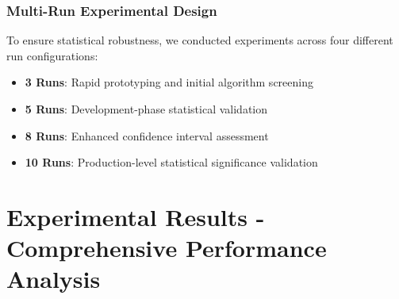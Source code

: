 \documentclass[12pt,a4paper]{article}
\begin{document}
\subsubsection{Multi-Run Experimental Design}

To ensure statistical robustness, we conducted experiments across four different run configurations:

\begin{itemize}
\item \textbf{3 Runs}: Rapid prototyping and initial algorithm screening
\item \textbf{5 Runs}: Development-phase statistical validation  
\item \textbf{8 Runs}: Enhanced confidence interval assessment
\item \textbf{10 Runs}: Production-level statistical significance validation
\end{itemize}

\section{Experimental Results - Comprehensive Performance Analysis}
\end{document}
